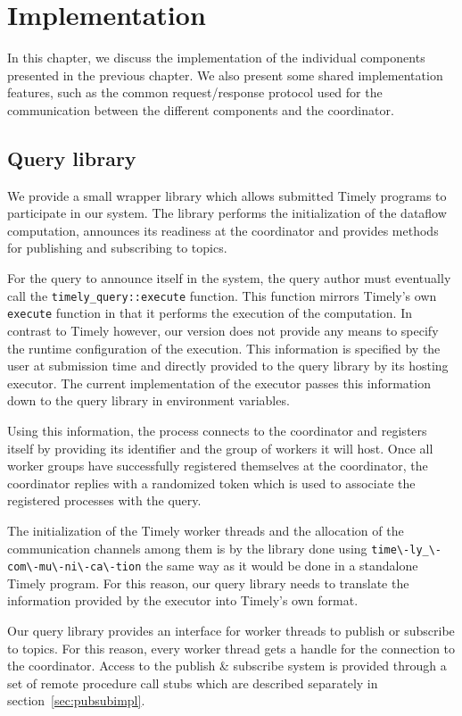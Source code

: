 \chapter{Implementation}\label{ch:impl}

In this chapter, we discuss the implementation of the individual components
presented in the previous chapter. We also present some shared implementation
features, such as the common request/response protocol used for the
communication between the different components and the coordinator.

\section{Query library}

We provide a small wrapper library which allows submitted Timely programs to participate
in our system. The library performs the initialization of the dataflow computation,
announces its readiness at the coordinator and provides methods for
publishing and subscribing to topics.

For the query to announce itself in the system, the query author must eventually
call the \lstinline{timely_query::execute} function. This function
mirrors Timely's own \lstinline{execute} function in that it performs the execution
of the computation. In contrast to Timely however, our version does not provide
any means to specify the runtime configuration of the execution. This information
is specified by the user at submission time and directly provided to the query library
by its hosting executor. The current implementation of the executor passes
this information down to the query library in environment variables. 

Using this information, the process connects to the coordinator and registers
itself by providing its identifier and the group of workers it will host. Once
all worker groups have successfully registered themselves at the coordinator,
the coordinator replies with a randomized token which is used to associate
the registered processes with the query.

The initialization of the Timely worker threads and the allocation of the
communication channels among them is by the library done using
\lstinline{time\-ly_\-com\-mu\-ni\-ca\-tion} the same way as it would be done
in a standalone Timely program. For this reason, our query library needs to
translate the information provided by the executor into Timely's own format.


Our query library provides an interface for worker threads to
publish or subscribe to topics. For this reason, every worker thread gets
a handle for the connection to the coordinator. Access to the
publish \& subscribe system is provided through a set of remote
procedure call stubs which are described separately in section~\ref{sec:pubsubimpl}.


